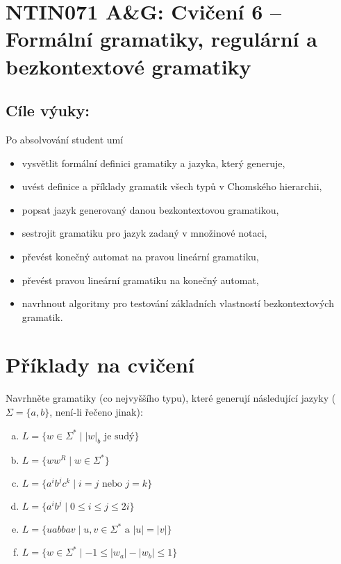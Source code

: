 \documentclass[a4paper,12pt]{amsart}
\begin{document}
\thispagestyle{empty}

\section*{NTIN071 A\&G: Cvičení 6 -- Formální gramatiky, regulární a bezkontextové gramatiky}

\medskip

\subsection*{Cíle výuky:} Po absolvování student umí

\begin{itemize}\setlength{\itemsep}{0pt}
    \item vysvětlit formální definici gramatiky a jazyka, který generuje,
    \item uvést definice a příklady gramatik všech typů v Chomského hierarchii,
    \item popsat jazyk generovaný danou bezkontextovou gramatikou,
    \item sestrojit gramatiku pro jazyk zadaný v množinové notaci,
    \item převést konečný automat na pravou lineární gramatiku,
    \item převést pravou lineární gramatiku na konečný automat,
    \item navrhnout algoritmy pro testování základních vlastností bezkontextových gramatik.
\end{itemize}


\section*{Příklady na cvičení}


\medskip\begin{problem}

    Navrhněte gramatiky (co nejvyššího typu), které generují následující jazyky ($\Sigma=\{a,b\}$, není-li řečeno jinak):
    
    \vspace{-3pt}
    \begin{multicols}{2}
    \begin{enumerate}[(a)]
        \item $L=\{w\in\Sigma^*\mid |w|_b\text{ je sudý}\} $
        \item $L=\{ww^R\mid w\in \Sigma^*\}$        
        \item $L = \{a^ib^jc^k\mid i = j\text{ nebo }j = k\}$        
        \item $L=\{a^i b^j\mid 0\leq i\leq j\leq 2i\}$
        \item $L=\{uabbav\mid u,v\in\Sigma^*\text{ a }|u|=|v|\}$
        \item $L=\{w\in \Sigma^*\mid -1\leq |w_a|-|w_b|\leq 1\}$        
    \end{enumerate}
    \end{multicols}

\end{problem}
\end{document}
